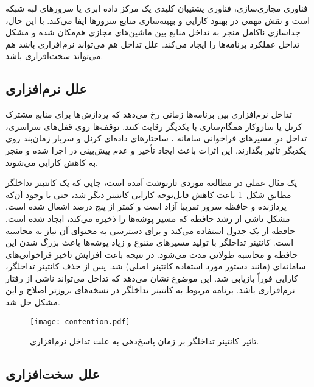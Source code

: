 فناوری مجازی‌سازی، فناوری پشتیبان کلیدی یک مرکز داده ابری یا سرورهای لبه شبکه است و نقش مهمی در بهبود کارایی و بهینه‌سازی منابع سرورها ایفا می‌کند. با این حال، جداسازی ناکامل منجر به تداخل منابع بین ماشین‌های مجازی هم‌مکان شده و مشکل تداخل عملکرد برنامه‌ها را ایجاد می‌کند. علل تداخل هم می‌تواند نرم‌افزاری باشد هم می‌تواند سخت‌افزاری باشد.

\subsection{علل نرم‌افزاری}

تداخل نرم‌افزاری بین برنامه‌ها زمانی رخ می‌دهد که پردازش‌ها برای منابع مشترک کرنل یا سازوکار همگام‌سازی با یکدیگر رقابت کنند. توقف‌ها روی قفل‌های سراسری، تداخل در مسیرهای فراخوانی سامانه ، ساختارهای داده‌ای کرنل و سربار زمان‌بند روی یکدیگر تأثیر بگذارند. این اثرات باعث ایجاد تأخیر و عدم پیش‌بینی در اجرا شده و منجر به کاهش کارایی می‌شوند.

یک مثال عملی در مطالعه موردی تارنوشت  آمده است\cite{sysdig2017isolation}، جایی که یک کانتینر تداخلگر مطابق شکل~\ref{figure:software_contention} باعث کاهش قابل‌توجه کارایی کانتینر دیگر شد، حتی با وجود آن‌که پردازنده و حافظه سرور تقریبا آزاد است و کمتر از پنج درصد اشغال شده است. مشکل ناشی از رشد حافظه  که مسیر پوشه‌ها را ذخیره‌ می‌کند، ایجاد شده است. حافظه  از یک جدول  استفاده می‌کند و برای دسترسی به محتوای آن نیاز به محاسبه  است. کانتینر تداخلگر با تولید مسیرهای متنوع و زیاد پوشه‌ها باعث بزرگ شدن این حافظه و محاسبه طولانی مدت  می‌شود. در نتیجه باعث افزایش تأخیر فراخوانی‌های سامانه‌ای (مانند دستور  مورد استفاده کانتینر اصلی) شد. پس از حذف کانتینر تداخلگر، کارایی فوراً بازیابی شد. این موضوع نشان می‌دهد که تداخل می‌تواند ناشی از رفتار نرم‌افزاری باشد. برنامه مربوط به کانتینر تداخلگر در نسخه‌های بروز‌تر اصلاح و این مشکل حل شد.

\vspace{0.5cm}
\begin{figure}[h]
\centering
\texttt{[image: contention.pdf]}
\caption{تاثیر کانتینر تداخلگر بر زمان پاسخ‌دهی به علت تداخل نرم‌افزاری\cite{sysdig2017isolation}.}
\label{figure:software_contention}
\end{figure}
\vspace{0.5cm}

\subsection{علل سخت‌افزاری}

